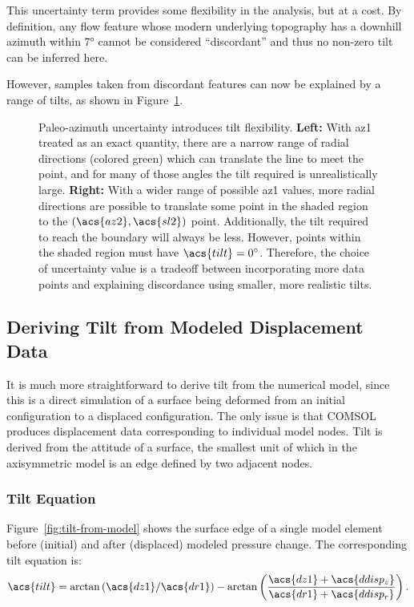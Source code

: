 This uncertainty term provides some flexibility in the analysis, but at a cost. By definition, any flow feature whose modern underlying topography has a downhill azimuth within \ang{7} cannot be considered ``discordant'' and thus no non-zero tilt can be inferred here.

However, samples taken from discordant features can now be explained by a range of tilts, as shown in Figure~\ref{fig:az1-uncertainty}.

\begin{figure}
    \caption[Paleo-azimuth uncertainty]{Paleo-azimuth uncertainty introduces tilt flexibility. \textbf{Left:} With \acs{az1} treated as an exact quantity, there are a narrow range of radial directions (colored green) which can translate the line to meet the point, and for many of those angles the tilt required is unrealistically large. \textbf{Right:} With a wider range of possible \acs{az1} values, more radial directions are possible to translate some point in the shaded region to the $(\acs{az2},\acs{sl2})$ point. Additionally, the tilt required to reach the boundary will always be less. However, points within the shaded region must have $\acs{tilt}=\ang{0}$. Therefore, the choice of uncertainty value is a tradeoff between incorporating more data points and explaining discordance using smaller, more realistic tilts.}%
    \label{fig:az1-uncertainty}
\end{figure}

\subsection{Deriving Tilt from Modeled Displacement Data}\label{sec:tilt-from-model}

It is much more straightforward to derive tilt from the numerical model, since this is a direct simulation of a surface being deformed from an initial configuration to a displaced configuration. The only issue is that COMSOL produces displacement data corresponding to individual model nodes. Tilt is derived from the attitude of a surface, the smallest unit of which in the axisymmetric model is an edge defined by two adjacent nodes.

\subsubsection{Tilt Equation}
Figure~\ref{fig:tilt-from-model} shows the surface edge of a single model element before (initial) and after (displaced) modeled pressure change. The corresponding tilt equation is:
\begin{equation}
    \acs{tilt} = \arctan\left({\acs{dz1}}/{\acs{dr1}}\right) - \arctan\left(\dfrac{\acs{dz1}+\acs{ddisp_z}}{\acs{dr1}+\acs{ddisp_r}}\right).\label{eq:tilt-from-model}
\end{equation}

